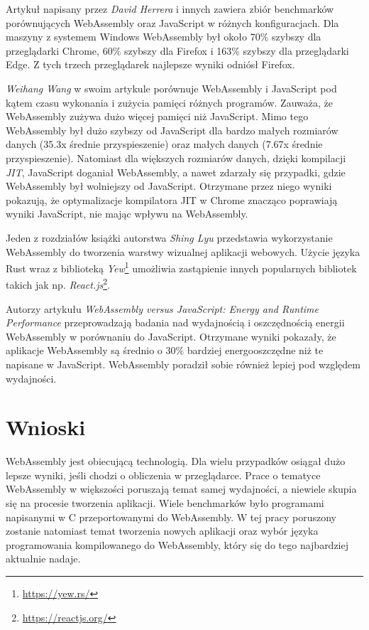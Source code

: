 \documentclass[language=polish,type=master]{aghmodern}
\begin{document}
Artykuł \cite{wasm_js_bench} napisany przez \emph{David Herrera} i innych zawiera zbiór benchmarków porównujących WebAssembly oraz JavaScript w różnych konfiguracjach.
Dla maszyny z systemem Windows WebAssembly był około 70\% szybszy dla przeglądarki Chrome, 60\% szybszy dla Firefox i 163\% szybszy dla przeglądarki Edge.
Z tych trzech przeglądarek najlepsze wyniki odniósł Firefox.

\emph{Weihang Wang} w swoim artykule \cite{wasm_js_bench2} porównuje WebAssembly i JavaScript pod kątem czasu wykonania i zużycia pamięci różnych programów.
Zauważa, że WebAssembly zużywa dużo więcej pamięci niż JavaScript.
Mimo tego WebAssembly był dużo szybszy od JavaScript dla bardzo małych rozmiarów danych (35.3x średnie przyspieszenie) oraz małych danych (7.67x średnie przyspieszenie).
Natomiast dla większych rozmiarów danych, dzięki kompilacji \emph{JIT}\footnotemark{}, JavaScript doganiał WebAssembly, a nawet zdarzały się przypadki, gdzie WebAssembly był wolniejszy od JavaScript.
Otrzymane przez niego wyniki pokazują, że optymalizacje kompilatora JIT w Chrome znacząco poprawiają wyniki JavaScript, nie mając wpływu na WebAssembly.

Jeden z rozdziałów książki \cite{wasm_yew} autorstwa \emph{Shing Lyu} przedstawia wykorzystanie WebAssembly do tworzenia warstwy wizualnej aplikacji webowych.
Użycie języka Rust wraz z biblioteką \emph{Yew}\footnote{\url{https://yew.rs/}} umożliwia zastąpienie innych popularnych bibliotek takich jak np. \emph{React.js}\footnote{\url{https://reactjs.org/}}.

Autorzy artykułu \cite{wasm_energy} \emph{WebAssembly versus JavaScript: Energy and Runtime Performance} przeprowadzają badania nad wydajnością i oszczędnością energii WebAssembly w porównaniu do JavaScript.
Otrzymane wyniki pokazały, że aplikacje WebAssembly są średnio o 30\% bardziej energooszczędne niż te napisane w JavaScript.
WebAssembly poradził sobie również lepiej pod względem wydajności.

\section{Wnioski}
WebAssembly jest obiecującą technologią.
Dla wielu przypadków osiągał dużo lepsze wyniki, jeśli chodzi o obliczenia w przeglądarce.
Prace o tematyce WebAssembly w większości poruszają temat samej wydajności, a niewiele skupia się na procesie tworzenia aplikacji.
Wiele benchmarków było programami napisanymi w C przeportowanymi\footnotemark{} do WebAssembly.
W tej pracy poruszony zostanie natomiast temat tworzenia nowych aplikacji oraz wybór języka programowania kompilowanego do WebAssembly, który się do tego najbardziej aktualnie nadaje.
\end{document}
